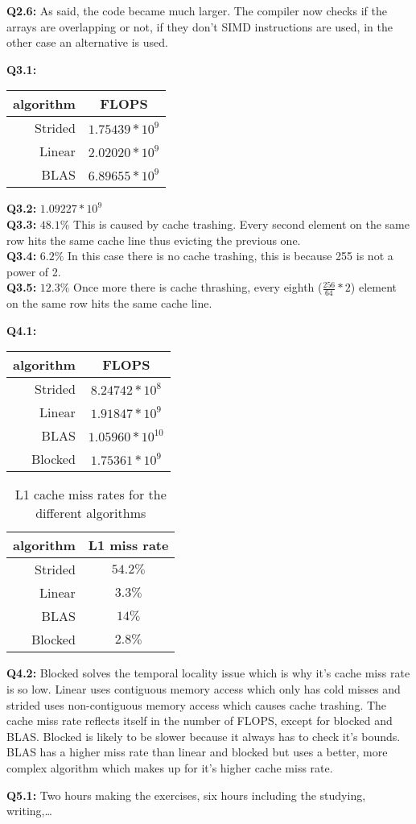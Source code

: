 \documentclass[10pt]{report}
\begin{document}
\textbf{Q2.6:} As said, the code became much larger. The compiler now checks if the arrays are overlapping or not, if they don't SIMD instructions are used, in the other case an alternative is used.\par
\textbf{Q3.1:}
    \begin{tabular}{r|c}
        algorithm&FLOPS\\
        \hline
          Strided&$1.75439 * 10^{9}$\\
           Linear&$2.02020 * 10^{9}$\\
             BLAS&$6.89655 * 10^{9}$\\
      \end{tabular}\par
\textbf{Q3.2:} $1.09227 * 10^{9}$\\
\textbf{Q3.3:} $48.1\%$ This is caused by cache trashing. Every second element on the same row hits the same cache line thus evicting the previous one.\\
\textbf{Q3.4:} $6.2\%$ In this case there is no cache trashing, this is because 255 is not a power of 2.\\
\textbf{Q3.5:} $12.3\%$ Once more there is cache thrashing, every eighth ($\frac{256}{64}*2$) element on the same row hits the same cache line.\par
\textbf{Q4.1:} 
    \begin{tabular}{r|c}
        algorithm&FLOPS\\
        \hline
          Strided&$8.24742 * 10^{8}$\\
           Linear&$1.91847 * 10^{9}$\\
             BLAS&$1.05960 * 10^{10}$\\
          Blocked&$1.75361 * 10^{9}$\\
    \end{tabular}\par
\begin{wraptable}{r}{5cm}
    \centering
    \begin{tabular}{r|c}
        algorithm&L1 miss rate\\
        \hline
          Strided&$54.2\%$\\
           Linear&$3.3\%$\\
             BLAS&$14\%$\\
          Blocked&$2.8\%$\\
    \end{tabular}
    \caption{L1 cache miss rates for the different algorithms}
\end{wraptable}
\textbf{Q4.2:} Blocked solves the temporal locality issue which is why it's cache miss rate is so low. Linear uses contiguous memory access which only has cold misses and strided uses non-contiguous memory access which causes cache trashing. The cache miss rate reflects itself in the number of FLOPS, except for blocked and BLAS. Blocked is likely to be slower because it always has to check it's bounds. BLAS has a higher miss rate than linear and blocked but uses a better, more complex algorithm which makes up for it's higher cache miss rate. \par
\textbf{Q5.1:} Two hours making the exercises, six hours including the studying, writing,\ldots
\end{document}
